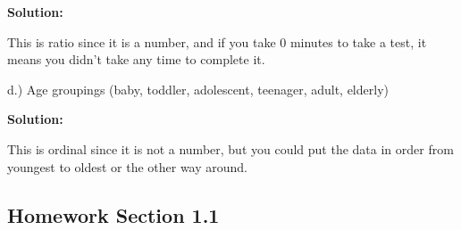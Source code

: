 \documentclass[
]{book}
\begin{document}
\textbf{Solution:}

This is ratio since it is a number, and if you take 0 minutes to take a test, it means you didn't take any time to complete it.

d.) Age groupings (baby, toddler, adolescent, teenager, adult, elderly)

\textbf{Solution:}

This is ordinal since it is not a number, but you could put the data in order from youngest to oldest or the other way around.

\hypertarget{homework-section-1.1}{%
\subsection{Homework Section 1.1}\label{homework-section-1.1}}
\end{document}
